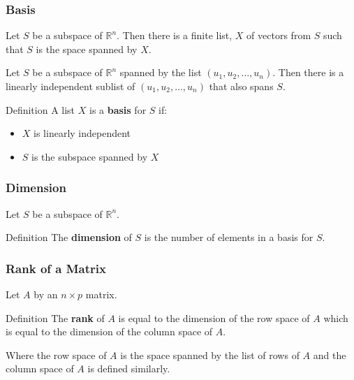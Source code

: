 \documentclass{beamer}
\newcommand{\RealN}{\ensuremath{\mathbb{R}^n}}
\begin{document}
\begin{frame}
  \frametitle{Basis}

Let $S$ be a subspace of \RealN.  Then there is a finite list, $X$ of vectors from $S$ such that $S$ is the space spanned by $X$.
\medskip

Let $S$ be a subspace of $\RealN$ spanned by the list $(u_1, u_2, \ldots, u_n)$. Then  there is a linearly independent sublist of $(u_1, u_2, \ldots, u_n)$ that also spans $S$.
\medskip

\begin{block}{Definition}
A list $X$ is a \textbf{basis} for $S$ if:
\begin{itemize}
\item $X$ is linearly independent
\item $S$ is the subspace spanned by $X$
\end{itemize}
\end{block}

\end{frame}

\begin{frame}
  \frametitle{Dimension}
Let $S$ be a subspace of \RealN. 
\bigskip

\begin{block}{Definition}
The \textbf{dimension} of $S$ is the number of elements in a basis for $S$.
\end{block}

\end{frame}


\begin{frame}
  \frametitle{Rank of a Matrix}
Let $A$ by an $n \times p$ matrix.
\bigskip

\begin{block}{Definition}
The \textbf{rank} of $A$ is equal to the dimension of the row space of $A$ which is equal to the dimension of the column space of $A$.
\end{block}
\bigskip
Where the row space of $A$ is the space spanned by the list of rows of $A$ and the column space of $A$ is defined similarly.

\end{frame}
\end{document}
